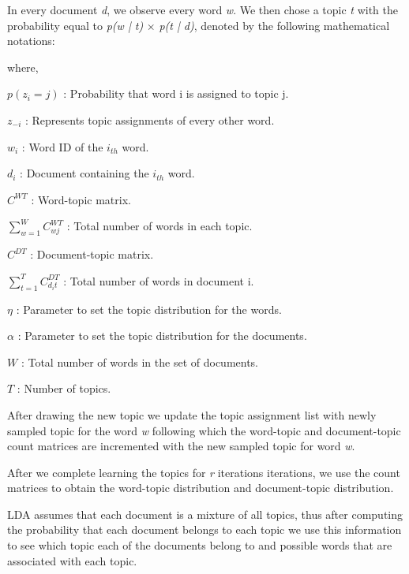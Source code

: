 \documentclass{article}
\begin{document}
	In every document \textit{d}, we observe every word \textit{w}.  We then chose a topic \textit{t} with the probability equal to 	\textit{p(w | t)} $	\times$ \textit{p(t | d)}, denoted by the following mathematical notations:
	
\twocolumn[
\vskip 0.3 in

$$ p( z_i = j \text{ }| \text{ } z_{-i}, w_i, d_i ) = \frac{ C^{WT}{w_ij} + \eta }{ \sum^W{ w = 1 }C^{WT}{wj} + W\eta }\times 			\frac{ C^{DT}{d_ij} + \alpha }{ \sum^T_{ t = 1 }C^{DT}_{d_it} + T\alpha } $$


\vskip 0.3 in

]
where, 

$p(z_i = j)$ : Probability that word i is assigned to topic j.

$z_{-i}$ : Represents topic assignments of every other word.

$w_i$ : Word ID of the $i_{th}$ word.

$d_i$ : Document containing the $i_{th}$ word.

$C^{WT}$ : Word-topic matrix.

$\sum^W_{ w = 1 }C^{WT}_{wj}$ : Total number of words in each topic.

$C^{DT}$ : Document-topic matrix.

$\sum^T_{ t = 1 }C^{DT}_{d_it}$ : Total number of words in document i.

$\eta$ : Parameter to set the topic distribution for the words.

$\alpha$ : Parameter to set the topic distribution for the documents.

$W$ : Total number of words in the set of documents.

$T$ : Number of topics.


After drawing the new topic we update the topic assignment list with newly sampled topic for the word \textit{w} following which the word-topic and document-topic count matrices are incremented with the new sampled topic for word \textit{w}.

After we complete learning the topics for \textit{r} iterations iterations, we use the count matrices to obtain the word-topic distribution and document-topic distribution.

LDA assumes that each document is a mixture of all topics, thus after computing the probability that each document belongs to each topic we use this information to see which topic each of the documents belong to and possible words that are associated with each topic.
\end{document}
